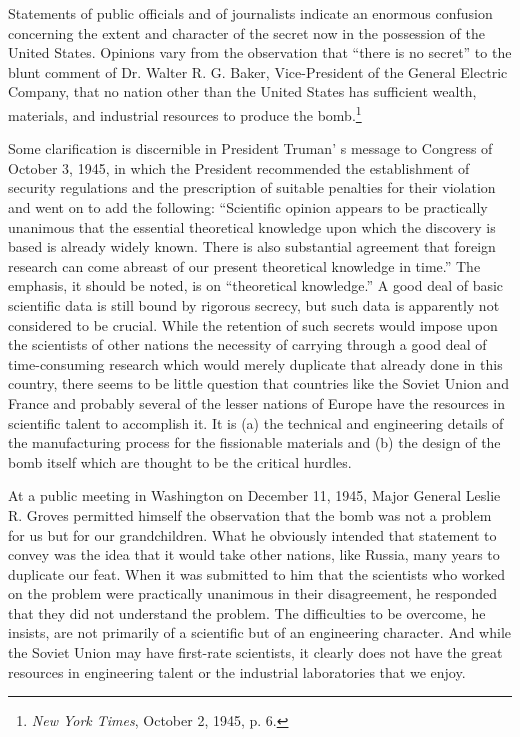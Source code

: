 Statements of public officials and of journalists indicate an enormous confusion concerning the extent and character of the secret now in the possession of the United States. Opinions vary from the observation that ``there is no secret'' to the blunt comment of Dr. Walter R. G. Baker, Vice-President of the General Electric Company, that no nation other than the United States has sufficient wealth, materials, and industrial resources to produce the bomb.\footnote{\textit{New York Times}, October 2, 1945, p. 6.}

Some clarification is discernible in President Truman' s message to Congress of October 3, 1945, in which the President recommended the establishment of security regulations and the prescription of suitable penalties for their violation and went on to add the following: ``Scientific opinion appears to be practically unanimous that the essential theoretical knowledge upon which the discovery is based is already widely known. There is also substantial agreement that foreign research can come abreast of our present theoretical knowledge in time.'' The emphasis, it should be noted, is on ``theoretical knowledge.'' A good deal of basic scientific data is still bound by rigorous secrecy, but such data is apparently not considered to be crucial. While the retention of such secrets would impose upon the scientists of other nations the necessity of carrying through a good deal of time-consuming research which would merely duplicate that already done in this country, there seems to be little question that countries like the Soviet Union and France and probably several of the lesser nations of Europe have the resources in scientific talent to accomplish it. It is (a) the technical and engineering details of the manufacturing process for the fissionable materials and (b) the design of the bomb itself which are thought to be the critical hurdles.

At a public meeting in Washington on December 11, 1945, Major General Leslie R. Groves permitted himself the observation that the bomb was not a problem for us but for our grandchildren. What he obviously intended that statement to convey was the idea that it would take other nations, like Russia, many years to duplicate our feat. When it was submitted to him that the scientists who worked on the problem were practically unanimous in their disagreement, he responded that they did not understand the problem. The difficulties to be overcome, he insists, are not primarily of a scientific but of an engineering character. And while the Soviet Union may have first-rate scientists, it clearly does not have the great resources in engineering talent or the industrial laboratories that we enjoy.

